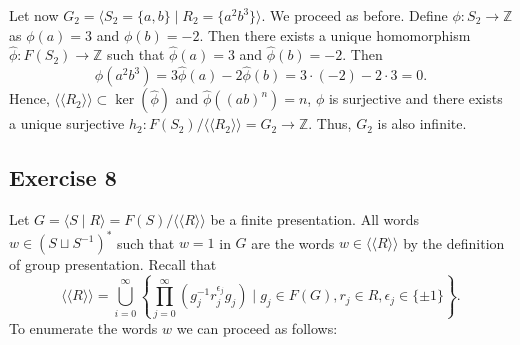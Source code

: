 \documentclass[11pt,a4paper]{article}
\newcommand{\Z}{\mathbb Z}
\begin{document}
Let now $ G_2 = \langle S_2 = \{a, b\} \mid R_2 = \{a^2 b^3\} \rangle $. We proceed as before. Define $ \phi \colon S_2 \to \Z $ as $ \phi(a) = 3 $ and $ \phi(b) = -2 $. Then there exists a unique homomorphism $ \hat \phi \colon F(S_2) \to \Z $ such that $ \hat \phi(a) = 3 $ and $ \hat \phi(b) = -2 $. Then
$$
  \hat \phi (a^2 b^3) = 3 \hat\phi(a) -2 \hat\phi(b) = 3 \cdot (-2) -2 \cdot 3 = 0.
$$
Hence, $ \langle \langle R_2 \rangle \rangle \subset \ker (\hat \phi) $ and $ \hat \phi((ab)^n) = n $,  $ \phi $ is surjective and there exists a unique surjective $ h_2: F(S_2)/\langle \langle R_2 \rangle \rangle = G_2 \to \Z $. Thus, $ G_2 $ is also infinite.

\subsection*{Exercise 8}
Let $ G = \langle S \mid R \rangle = F(S) / \langle \langle R \rangle \rangle $ be a finite presentation. All words $ w \in (S \sqcup S^{-1})^* $ such that $ w = 1 $ in $ G $ are the words $ w \in \langle \langle R \rangle \rangle $ by the definition of group presentation. Recall that
$$
  \langle \langle R \rangle \rangle = \bigcup_{i=0}^\infty \left\{ \prod_{j=0}^\infty (g_j^{-1} r_j^{\epsilon_j} g_j) \mid g_j \in F(G), r_j \in R, \epsilon_j \in \{ \pm 1 \} \right\}.
$$
To enumerate the words $ w $ we can proceed as follows:
\end{document}
